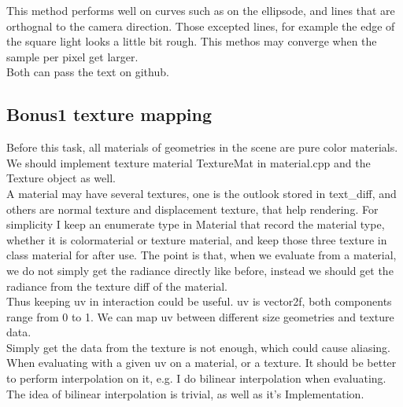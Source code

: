 \documentclass[acmtog]{acmart}
\begin{document}
This method performs well on curves such as on the ellipsode, and lines that are orthognal to the camera direction. Those excepted lines, for example the edge of the square light looks a little bit rough. This methos may converge when the sample per pixel get larger.\\
Both can pass the text on github.
\subsection{Bonus1 texture mapping}
Before this task, all materials of geometries in the scene are pure color materials. We should implement texture material TextureMat in material.cpp and the Texture object as well.\\
A material may have several textures, one is the outlook stored in text\_diff, and others are normal texture and displacement texture, that help rendering. For simplicity I keep an enumerate type in Material that record the material type, whether it is colormaterial or texture material, and keep those three texture in class material for after use. The point is that, when we evaluate from a material, we do not simply get the radiance directly like before, instead we should get the radiance from the texture diff of the material.\\
Thus keeping uv in interaction could be useful. uv is vector2f, both components range from 0 to 1. We can map uv between different size geometries and texture data.\\
Simply get the data from the texture is not enough, which could cause aliasing. When evaluating with a given uv on a material, or a texture. It should be better to perform interpolation on it, e.g. I do bilinear interpolation when evaluating. The idea of bilinear interpolation is trivial, as well as it's Implementation.
\end{document}
